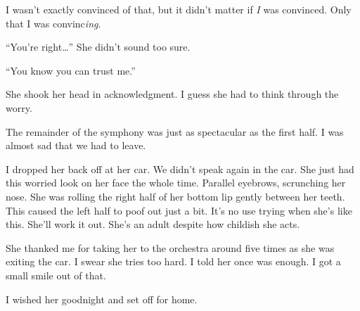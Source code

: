 \noindent
I wasn't exactly convinced of that,
but it didn't matter if \textit{I} was convinced.
Only that I was convinc\textit{ing}.
\VV


``You're right\ldots{}''  She didn't sound too sure.


``You know you can trust me.''
\VV


\noindent
She shook her head in acknowledgment.
I guess she had to think through the worry.
\VV


\noindent
The remainder of the symphony was just as spectacular
as the first half.
I was almost sad that we had to leave.
\VV


\noindent
I dropped her back off at her car.
We didn't speak again in the car.
She just had this worried look on her face
the whole time.
Parallel eyebrows, scrunching her nose.
She was rolling the right half of her bottom
lip gently between her teeth.
This caused the left half to poof out just a bit.
It's no use trying when she's like this.
She'll work it out.
She's an adult despite how childish she acts.


She thanked me for taking her to the orchestra around five times as
she was exiting the car.  I swear she tries too hard.
I told her once was enough.  I got a small smile out of that.


I wished her goodnight and set off for home.
\lhoarb
